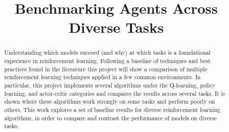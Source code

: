 \documentclass[conference]{IEEEtran}
\begin{document}
\title{Benchmarking Agents Across Diverse Tasks}

\author{

\and


\and


\and


\and

}

\maketitle

\begin{abstract}
    Understanding which models succeed (and why) at which tasks is a foundational experience in reinforcement learning.
    Following a baseline of techniques and best practices found in the literature this project will show a comparison of multiple reinforcement learning techniques applied in a few common environments.
    In particular, this project implements several algorithms under the Q-learning, policy learning, and actor-critic categories and compares the results across several tasks.
    It is shown where these algorithms work strongly on some tasks and perform poorly on others.
    This work explores a set of baseline results for diverse reinforcement learning algorithms, in order to compare and contrast the performance of models on diverse tasks.
\end{abstract}
\end{document}
